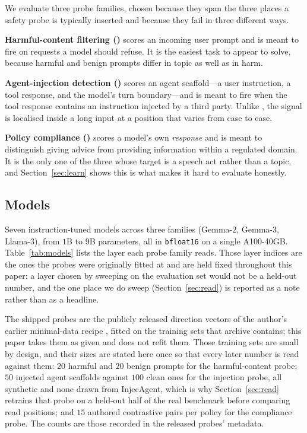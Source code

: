 We evaluate three probe families, chosen because they span the three places a safety probe is typically inserted and
because they fail in three different ways.

\textbf{Harmful-content filtering (\af{})} scores an incoming user prompt and is meant to fire on requests a model
should refuse. It is the easiest task to appear to solve, because harmful and benign prompts differ in topic as well
as in harm.

\textbf{Agent-injection detection (\aag{})} scores an agent scaffold---a user instruction, a tool response, and the
model's turn boundary---and is meant to fire when the tool response contains an instruction injected by a third party.
Unlike \af{}, the signal is localised inside a long input at a position that varies from case to case.

\textbf{Policy compliance (\apc{})} scores a model's own \emph{response} and is meant to distinguish giving advice
from providing information within a regulated domain. It is the only one of the three whose target is a speech act
rather than a topic, and Section~\ref{sec:learn} shows this is what makes it hard to evaluate honestly.

\subsection{Models}
\label{sec:models}

Seven instruction-tuned models across three families (Gemma-2, Gemma-3, Llama-3), from $1$B to $9$B parameters, all in
\texttt{bfloat16} on a single A100-40GB. Table~\ref{tab:models} lists the layer each probe family reads. Those layer
indices are the ones the probes were originally fitted at and are held fixed throughout this paper: a layer chosen by
sweeping on the evaluation set would not be a held-out number, and the one place we do sweep (Section~\ref{sec:read})
is reported as a note rather than as a headline.



The shipped probes are the publicly released direction vectors of the author's earlier minimal-data recipe
\cite{messenger2026aase}, fitted on the training sets that archive contains; this paper takes them as given and does
not refit them. Those training sets are small by design, and their sizes are stated here once so that every later
number is read against them: $20$ harmful and $20$ benign prompts for the harmful-content probe; $50$ injected agent
scaffolds against $100$ clean ones for the injection probe, all synthetic and none drawn from InjecAgent, which is why
Section~\ref{sec:read} retrains that probe on a held-out half of the real benchmark before comparing read positions;
and $15$ authored contrastive pairs per policy for the compliance probe. The counts are those recorded in the released
probes' metadata.

